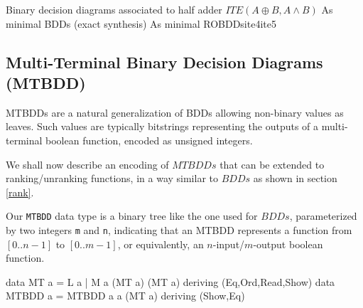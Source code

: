 \documentclass[]{INCLUDES/llncs}
\begin{document}
{Binary decision diagrams associated to half adder 
$ITE(A \oplus B,A \wedge B)$} 
{As minimal BDDs (exact synthesis)} 
{As minimal ROBDDs}{ite4}{ite5}

\subsection{Multi-Terminal Binary Decision Diagrams (MTBDD)} \label{multi}
MTBDDs \cite{DBLP:journals/fmsd/FujitaMY97,CBGP08} are a natural generalization
of BDDs allowing non-binary values as leaves.
Such values are typically 
bitstrings representing the outputs
of a multi-terminal boolean function,
encoded as unsigned integers.

We shall now describe an encoding of $MTBDDs$
that can be extended to ranking/unranking functions,
in a way similar to $BDDs$ as shown in section \ref{rank}.

Our {\tt MTBDD} data type is a binary tree like the one used for $BDDs$,
parameterized by two integers {\tt m} and {\tt n}, indicating
that an MTBDD represents a function from $[0..n-1]$ to $[0..m-1]$,
or equivalently, an $n$-input/$m$-output boolean function.

\begin{code}   
data MT a = L a | M a (MT a) (MT a) 
             deriving (Eq,Ord,Read,Show)
data MTBDD a = MTBDD a a (MT a) deriving (Show,Eq)
\end{code}
\end{document}
